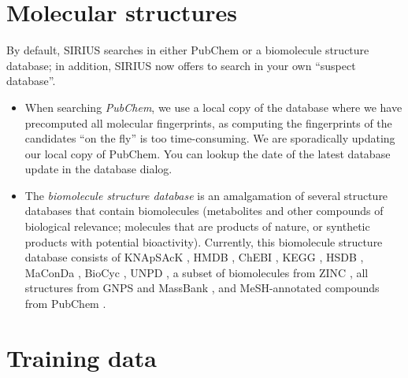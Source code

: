 \documentclass[letterpaper,10pt,openany,oneside]{sphinxmanual}
\newcommand{\todo}[1]{}
\begin{document}

\section{Molecular structures}

By default, SIRIUS searches in either PubChem or a biomolecule structure
database; in addition, SIRIUS now offers to search in your own ``suspect
database''.
%
\begin{itemize}
\item When searching \emph{PubChem}, we use a local copy of the database
  where we have precomputed all molecular fingerprints, as computing the
  fingerprints of the candidates ``on the fly'' is too time-consuming.  We
  are sporadically updating our local copy of PubChem.  
  You can lookup the date of the latest database update in the database dialog.

\item The \emph{biomolecule structure database} is an amalgamation of several
  structure databases that contain biomolecules (metabolites and other
  compounds of biological relevance; molecules that are products of nature,
  or synthetic products with potential bioactivity).  Currently, this
  biomolecule structure database consists of KNApSAcK \citep{shinbo06plant},
  HMDB \citep{wishart13hmdb}, ChEBI \citep{hastings13chebi},
  KEGG \citep{kanehisa16kegg}, HSDB \citep{fonger14national},
  MaConDa \citep{weber12maconda}, BioCyc \citep{caspi14metacyc},
  UNPD \citep{gu03unpd}, a subset of biomolecules from
  ZINC \citep{irwin12zinc}, all structures from GNPS \citep{wang16sharing}
  and MassBank \citep{horai10massbank}, and MeSH-annotated compounds from
  PubChem \citep{nelson01relationships, kim16pubchem}.
\end{itemize}


\section{Training data}
\end{document}
